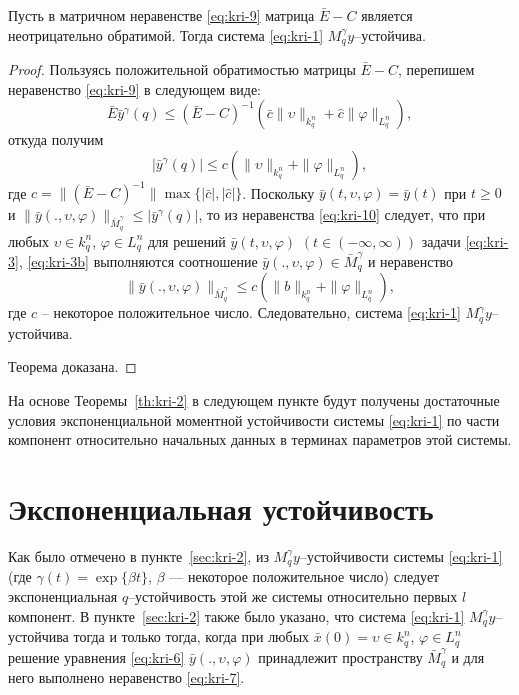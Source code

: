 \begin{theorem}\label{th:kri-2}
    Пусть в матричном неравенстве \eqref{eq:kri-9} матрица
    $\bar E - C$ является неотрицательно обратимой. Тогда система \eqref{eq:kri-1}
    $M_q^\gamma y$--устойчива.
\end{theorem}

\begin{proof}
    Пользуясь положительной обратимостью матрицы
    $\bar E - C$, перепишем неравенство \eqref{eq:kri-9} в следующем виде:
    $$
    \bar E\bar y^\gamma (q) \leq (\bar E - C)^{-1}\left(\bar
    c\|\upsilon\|_{k^n_{q}} + \hat c \|\varphi \|_{L^n_q}  \right),
    $$
    откуда получим
    \begin{equation}
        \label{eq:kri-10}
        |\bar y^\gamma (q)| \leq c\left (\|\upsilon\|_{k^n_{q}}+ \|\varphi
        \|_{L^n_q}\right ),
    \end{equation}
    где $c =\|(\bar E - C)^{-1}\|\max \{|\bar c|, |\hat c|\}$. Поскольку
    $\bar y(t,\upsilon,\varphi) = \bar y(t)$  при $t \geq 0$ и $\|\bar
    y(.,\upsilon,\varphi)\|_{\bar M_q^\gamma} \leq |\bar y^\gamma (q)|$,
    то из неравенства \eqref{eq:kri-10} следует, что при любых $\upsilon \in k^n_q$,
    $\varphi \in L^n_q$ для решений $\bar y(t, \upsilon, \varphi)$ $(t
    \in (-\infty, \infty))$ задачи \eqref{eq:kri-3}, \eqref{eq:kri-3b} выполняются соотношение
    $\bar y(., \upsilon, \varphi) \in \bar M_q^\gamma$ и неравенство
    $$
    \|\bar y(., \upsilon, \varphi)\|_{\bar M_q^\gamma} \le
    c(\|b\|_{k^n_q} + \|\varphi \|_{L^n_q}),
    $$
    где $c$ -- некоторое положительное число. Следовательно,  система
    \eqref{eq:kri-1} $M_q^\gamma y$--устойчива.
    
    Теорема доказана.
\end{proof}

На основе Теоремы~\ref{th:kri-2} в следующем пункте будут получены достаточные
условия экспоненциальной моментной устойчивости системы \eqref{eq:kri-1} по части
компонент относительно начальных данных в терминах параметров этой
системы.

\section{Экспоненциальная устойчивость}\label{sec:kri-3}

Как было отмечено в
пункте~\ref{sec:kri-2}, из $M_q^\gamma y$--устойчивости системы \eqref{eq:kri-1} (где $\gamma
(t) = \exp \{\beta t\}$, $\beta$ --- некоторое положительное число)
следует экспоненциальная $q$--устойчивость этой же системы
относительно первых $l$ компонент. В пункте~\ref{sec:kri-2} также было указано,
что система \eqref{eq:kri-1} $M_q^\gamma y$--устойчива тогда и только тогда,
когда при любых $\bar x(0) = \upsilon \in k^n_q$, $\varphi \in
L^n_q$ решение уравнения \eqref{eq:kri-6} $\bar y(., \upsilon, \varphi)$
принадлежит пространству $\bar M_q^\gamma $ и для него выполнено
неравенство \eqref{eq:kri-7}.

